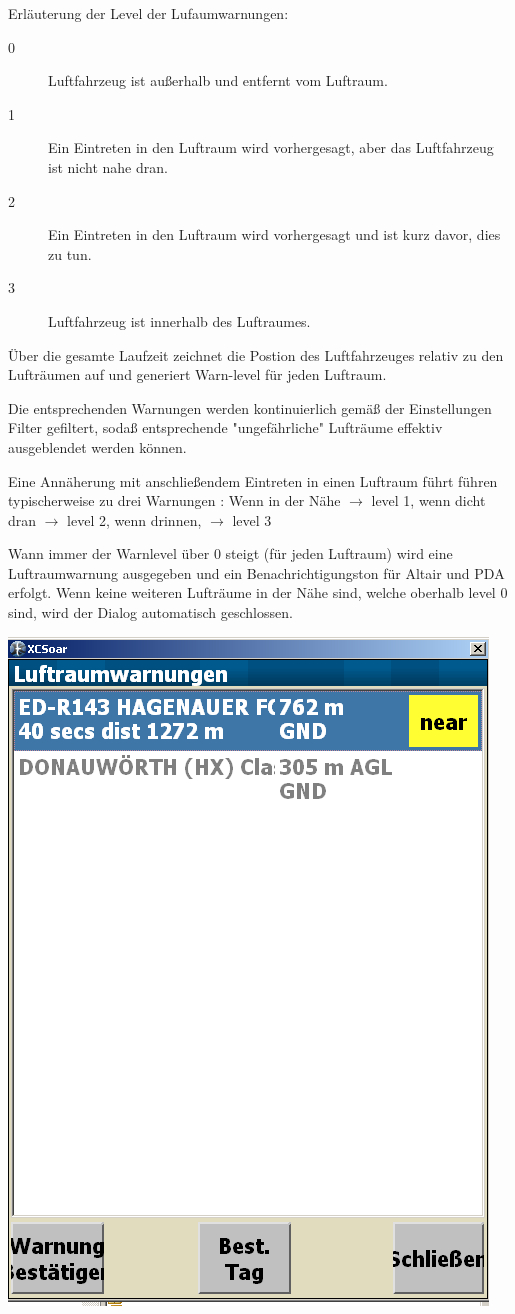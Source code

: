 Erläuterung der Level der Lufaumwarnungen:
\begin{description}
\item[0] Luftfahrzeug ist außerhalb und entfernt vom Luftraum.
\item[1] Ein Eintreten in den Luftraum wird vorhergesagt, aber das Luftfahrzeug ist nicht nahe dran.
\item[2] Ein Eintreten in den Luftraum wird vorhergesagt und ist kurz davor, dies zu tun.
\item[3] Luftfahrzeug ist innerhalb des Luftraumes.
\end{description}

Über die gesamte Laufzeit zeichnet \xc die Postion des Luftfahrzeuges  relativ zu den
Lufträumen auf und generiert Warn-level für jeden Luftraum.

Die entsprechenden Warnungen werden kontinuierlich gemäß der Einstellungen
Filter gefiltert, sodaß entsprechende "ungefährliche" Lufträume effektiv ausgeblendet
 werden können.

Eine Annäherung mit anschließendem Eintreten in einen Luftraum führt führen typischerweise zu drei Warnungen :
Wenn in der Nähe $\rightarrow$ level 1, wenn dicht dran $\rightarrow$ level 2, wenn drinnen, $\rightarrow$ level 3

Wann immer der Warnlevel über 0 steigt (für jeden Luftraum) wird eine
Luftraumwarnung ausgegeben und ein Benachrichtigungston für Altair und PDA erfolgt.
Wenn keine weiteren Lufträume in der Nähe sind, welche oberhalb level 0 sind,
wird der Dialog automatisch geschlossen.


\begin{center}
\includegraphics[angle=0,width=0.7\linewidth,keepaspectratio='true']{figures/airspacewarning.png}
\end{center}

